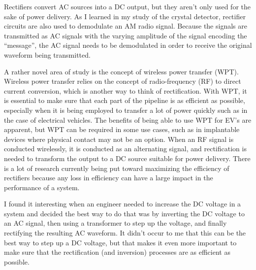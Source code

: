 

Rectifiers convert AC sources into a DC output, but
they aren't only used for the sake of power delivery.
As I learned in my study of the crystal detector, rectifier
circuits are also used to demodulate an AM radio signal.
Because the signals are transmitted as AC signals with
the varying amplitude of the signal encoding the ``message'',
the AC signal needs to be demodulated in order to receive
the original waveform being transmitted.


A rather novel area of study is the concept of wireless
power transfer (WPT). Wireless power transfer relies
on the concept of radio-frequency (RF) to direct current
conversion, which is another way to think of rectification.
With WPT, it is essential to make sure that each part
of the pipeline is as efficient as possible, especially
when it is being employed to transfer a lot of power
quickly such as in the case of electrical vehicles.
The benefits of being able to use WPT for EV's are apparent,
but WPT can be required in some use cases, such as in
implantable devices where physical contact may not be
an option. When an RF signal is conducted wirelessly,
it is conducted as an alternating signal, and rectification
is needed to transform the output to a DC source suitable
for power delivery. There is a lot of research currently
being put toward maximizing the efficiency of rectifiers
because any loss in efficiency can have a large impact
in the performance of a system.


I found it interesting when an engineer needed to increase
the DC voltage in a system and decided the best way
to do that was by inverting the DC voltage to an AC
signal, then using a transformer to step up the voltage,
and finally rectifying the resulting AC waveform. It
didn't occur to me that this can be the best way to
step up a DC voltage, but that makes it even more important
to make sure that the rectification (and inversion)
processes are as efficient as possible.
